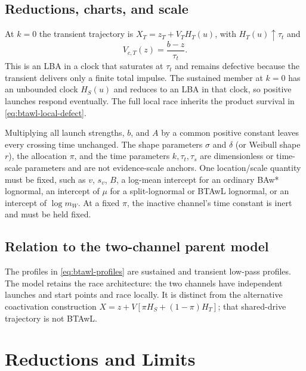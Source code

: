 \documentclass[12pt]{article}
\theoremstyle{remark}
\begin{document}
\subsection{Reductions, charts, and scale}
At $k=0$ the transient trajectory is $X_T=z_T+V_TH_T(u)$, with $H_T(u)\uparrow\tau_t$ and
\begin{equation}
  V_{c,T}(z)=\frac{b-z}{\tau_t}.
  \label{eq:btawl-k0}
\end{equation}
This is an LBA in a clock that saturates at $\tau_t$ and remains defective because the transient delivers only a finite total impulse.  The sustained member at $k=0$ has an unbounded clock $H_S(u)$ and reduces to an LBA in that clock, so positive launches respond eventually.  The full local race inherits the product survival in \eqref{eq:btawl-local-defect}.

Multiplying all launch strengths, $b$, and $A$ by a common positive constant leaves every crossing time unchanged.  The shape parameters $\sigma$ and $\delta$ (or Weibull shape $r$), the allocation $\pi$, and the time parameters $k,\tau_t,\tau_s$ are dimensionless or time-scale parameters and are not evidence-scale anchors. One location/scale quantity must be fixed, such as $v$, $s_v$, $B$, a log-mean intercept for an ordinary BAw* lognormal, an intercept of $\mu$ for a split-lognormal or BTAwL lognormal, or an intercept of $\log m_W$. At a fixed $\pi$, the inactive channel's time constant is inert and must be held fixed.

\subsection{Relation to the two-channel parent model}
The profiles in \eqref{eq:btawl-profiles} are sustained and transient low-pass profiles. The model retains the race architecture: the two channels have independent launches and start points and race locally.  It is distinct from the alternative coactivation construction $X=z+V[\pi H_S+(1-\pi)H_T]$; that shared-drive trajectory is not BTAwL.

\section{Reductions and Limits}
\label{sec:reductions}
\end{document}
